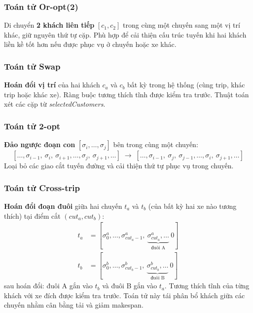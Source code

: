 \documentclass[../DoAn.tex]{subfiles}
\begin{document}
\subsubsection{Toán tử Or-opt(2)}

Di chuyển \textbf{2 khách liên tiếp} $[c_1, c_2]$ trong cùng một chuyến sang một vị trí khác, giữ nguyên thứ tự cặp. Phù hợp để cải thiện cấu trúc tuyến khi hai khách liền kề tốt hơn nếu được phục vụ ở chuyến hoặc xe khác.

\subsubsection{Toán tử Swap}

\textbf{Hoán đổi vị trí} của hai khách $c_a$ và $c_b$ bất kỳ trong hệ thống (cùng trip, khác trip hoặc khác xe). Ràng buộc tương thích tĩnh được kiểm tra trước. Thuật toán xét các cặp từ \textit{selectedCustomers}.

\subsubsection{Toán tử 2-opt}

\textbf{Đảo ngược đoạn con} $[\sigma_i, \ldots, \sigma_j]$ bên trong cùng một chuyến:
\[
[\ldots, \sigma_{i-1},\ \sigma_i,\ \sigma_{i+1},\ldots, \sigma_j,\ \sigma_{j+1},\ldots]
\;\longrightarrow\;
[\ldots, \sigma_{i-1},\ \sigma_j,\ \sigma_{j-1},\ldots, \sigma_i,\ \sigma_{j+1},\ldots]
\]
Loại bỏ các giao cắt tuyến đường và cải thiện thứ tự phục vụ trong chuyến.

\subsubsection{Toán tử Cross-trip}

\textbf{Hoán đổi đoạn đuôi} giữa hai chuyến $t_a$ và $t_b$ (của bất kỳ hai xe nào tương thích) tại điểm cắt $(\mathit{cut}_a, \mathit{cut}_b)$:
\begin{align*}
t_a &= [\sigma^a_0, \ldots, \sigma^a_{\mathit{cut}_a - 1},\ \underbrace{\sigma^a_{\mathit{cut}_a}, \ldots}_{\text{đuôi A}}\ 0] \\
t_b &= [\sigma^b_0, \ldots, \sigma^b_{\mathit{cut}_b - 1},\ \underbrace{\sigma^b_{\mathit{cut}_b}, \ldots}_{\text{đuôi B}}\ 0]
\end{align*}
sau hoán đổi: đuôi A gắn vào $t_b$ và đuôi B gắn vào $t_a$. Tương thích tĩnh của từng khách với xe đích được kiểm tra trước. Toán tử này tái phân bổ khách giữa các chuyến nhằm cân bằng tải và giảm makespan.
\end{document}
